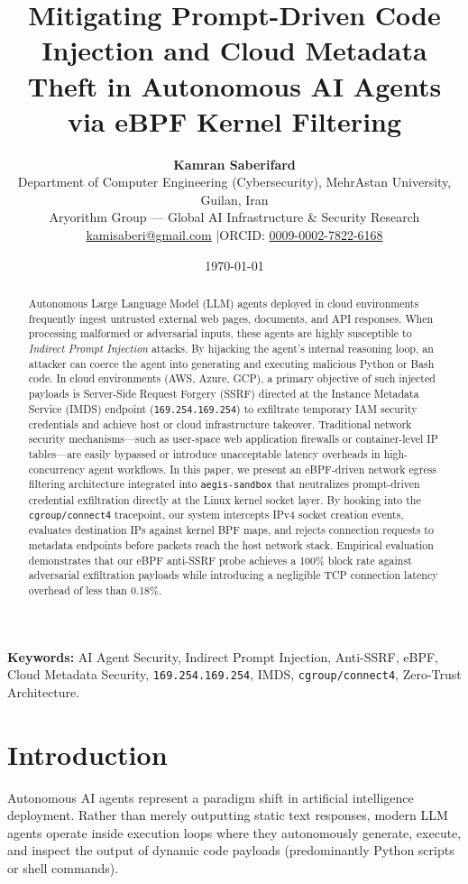 \documentclass[11pt,a4paper]{article}
\title{\Large\bfseries Mitigating Prompt-Driven Code Injection and Cloud Metadata Theft in Autonomous AI Agents via eBPF Kernel Filtering}
\author{
    \textbf{Kamran Saberifard}\\[4pt]
    Department of Computer Engineering (Cybersecurity), MehrAstan University, Guilan, Iran\\
    Aryorithm Group — Global AI Infrastructure \& Security Research\\
    \href{mailto:kamisaberi@gmail.com}{kamisaberi@gmail.com} \quad|\quad ORCID: \href{https://orcid.org/0009-0002-7822-6168}{0009-0002-7822-6168}
}
\date{\today}
\begin{document}
\maketitle

\begin{abstract}
\noindent Autonomous Large Language Model (LLM) agents deployed in cloud environments frequently ingest untrusted external web pages, documents, and API responses. When processing malformed or adversarial inputs, these agents are highly susceptible to \textit{Indirect Prompt Injection} attacks. By hijacking the agent's internal reasoning loop, an attacker can coerce the agent into generating and executing malicious Python or Bash code. In cloud environments (AWS, Azure, GCP), a primary objective of such injected payloads is Server-Side Request Forgery (SSRF) directed at the Instance Metadata Service (IMDS) endpoint (\texttt{169.254.169.254}) to exfiltrate temporary IAM security credentials and achieve host or cloud infrastructure takeover. Traditional network security mechanisms—such as user-space web application firewalls or container-level IP tables—are easily bypassed or introduce unacceptable latency overheads in high-concurrency agent workflows. In this paper, we present an eBPF-driven network egress filtering architecture integrated into \texttt{aegis-sandbox} that neutralizes prompt-driven credential exfiltration directly at the Linux kernel socket layer. By hooking into the \texttt{cgroup/connect4} tracepoint, our system intercepts IPv4 socket creation events, evaluates destination IPs against kernel BPF maps, and rejects connection requests to metadata endpoints before packets reach the host network stack. Empirical evaluation demonstrates that our eBPF anti-SSRF probe achieves a 100\% block rate against adversarial exfiltration payloads while introducing a negligible TCP connection latency overhead of less than 0.18\%.
\end{abstract}

\vspace{6pt}
\noindent\textbf{Keywords:} AI Agent Security, Indirect Prompt Injection, Anti-SSRF, eBPF, Cloud Metadata Security, \texttt{169.254.169.254}, IMDS, \texttt{cgroup/connect4}, Zero-Trust Architecture.

\hr

\section{Introduction}
Autonomous AI agents represent a paradigm shift in artificial intelligence deployment. Rather than merely outputting static text responses, modern LLM agents operate inside execution loops where they autonomously generate, execute, and inspect the output of dynamic code payloads (predominantly Python scripts or shell commands).
\end{document}
